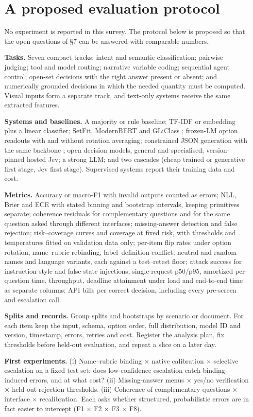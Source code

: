 \section{A proposed evaluation protocol}\label{sec:a-proposed-evaluation-protocol}

No experiment is reported in this survey. The protocol below is proposed so that the open questions of §7 can be answered with comparable numbers.

\textbf{Tasks.} Seven compact tracks: intent and semantic classification; pairwise judging; tool and model routing; narrative variable coding; sequential agent control; open-set decisions with the right answer present or absent; and numerically grounded decisions in which the needed quantity must be computed. Visual inputs form a separate track, and text-only systems receive the same extracted features.

\textbf{Systems and baselines.} A majority or rule baseline; TF-IDF or embedding plus a linear classifier; SetFit, ModernBERT and GLiClass \citep{arxiv2209_11055,arxiv2412_13663,arxiv2508_07662}; frozen-LM option readouts with and without rotation averaging; constrained JSON generation with the same backbone \citep{arxiv2411_15100}; open decision models, general and specialised; version-pinned hosted Jev; a strong LLM; and two cascades (cheap trained or generative first stage, Jev first stage). Supervised systems report their training data and cost.

\textbf{Metrics.} Accuracy or macro-F1 with invalid outputs counted as errors; NLL, Brier and ECE with stated binning and bootstrap intervals, keeping primitives separate; coherence residuals for complementary questions and for the same question asked through different interfaces; missing-answer detection and false rejection; risk–coverage curves and coverage at fixed risk, with thresholds and temperatures fitted on validation data only; per-item flip rates under option rotation, name–rubric rebinding, label–definition conflict, neutral and random names and language variants, each against a test–retest floor; attack success for instruction-style and false-state injections; single-request p50/p95, amortized per-question time, throughput, deadline attainment under load and end-to-end time as separate columns; API bills per correct decision, including every pre-screen and escalation call.

\textbf{Splits and records.} Group splits and bootstraps by scenario or document. For each item keep the input, schema, option order, full distribution, model ID and version, timestamp, errors, retries and cost. Register the analysis plan, fix thresholds before held-out evaluation, and repeat a slice on a later day.

\textbf{First experiments.} (i) Name–rubric binding × native calibration × selective escalation on a fixed test set: does low-confidence escalation catch binding-induced errors, and at what cost? (ii) Missing-answer menus × yes/no verification × held-out rejection thresholds. (iii) Coherence of complementary questions × interface × recalibration. Each asks whether structured, probabilistic errors are in fact easier to intercept (F1 × F2 × F3 × F8).
